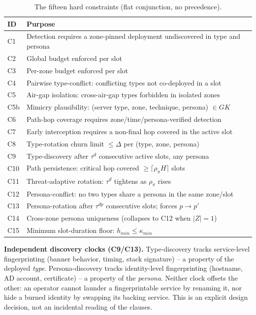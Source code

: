 \documentclass[10pt,twocolumn]{article}
\begin{document}
\begin{table}[t]
\centering
\caption{The fifteen hard constraints (flat conjunction, no precedence).}
\label{tab:constraints}
\small
\begin{tabular}{@{}p{0.5cm}p{7.1cm}@{}}
\toprule
ID & Purpose \\
\midrule
C1 & Detection requires a zone-pinned deployment undiscovered in type and persona \\
C2 & Global budget enforced per slot \\
C3 & Per-zone budget enforced per slot \\
C4 & Pairwise type-conflict: conflicting types not co-deployed in a slot \\
C5 & Air-gap isolation: cross-air-gap types forbidden in isolated zones \\
C5b & Mimicry plausibility: (server type, zone, technique, persona) $\in GK$ \\
C6 & Path-hop coverage requires zone/time/persona-verified detection \\
C7 & Early interception requires a non-final hop covered in the active slot \\
C8 & Type-rotation churn limit $\leq\Delta$ per (type, zone, persona) \\
C9 & Type-discovery after $\tau^d$ consecutive active slots, any persona \\
C10 & Path persistence: critical hop covered $\geq\lceil\rho_\pi H\rceil$ slots \\
C11 & Threat-adaptive rotation: $\tau^d$ tightens as $\rho_\pi$ rises \\
C12 & Persona-conflict: no two types share a persona in the same zone/slot \\
C13 & Persona-rotation after $\tau^{dp}$ consecutive slots; forces $p\to p'$ \\
C14 & Cross-zone persona uniqueness (collapses to C12 when $|Z|{=}1$) \\
C15 & Minimum slot-duration floor: $h_{min}\leq\kappa_{min}$ \\
\bottomrule
\end{tabular}
\end{table}

\textbf{Independent discovery clocks (C9/C13).} Type-discovery tracks service-level fingerprinting (banner behavior, timing, stack signature) -- a property of the deployed \emph{type}. Persona-discovery tracks identity-level fingerprinting (hostname, AD account, certificate) -- a property of the \emph{persona}. Neither clock offsets the other: an operator cannot launder a fingerprintable service by renaming it, nor hide a burned identity by swapping its backing service. This is an explicit design decision, not an incidental reading of the clauses.
\end{document}
